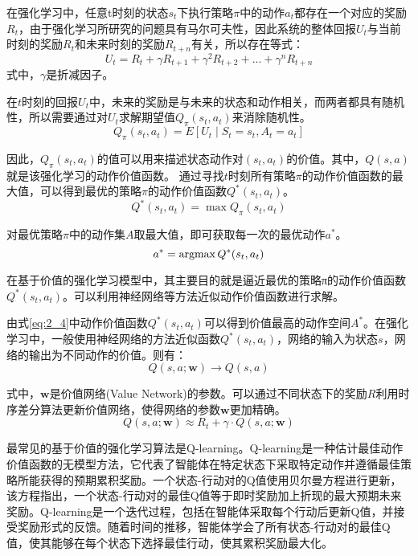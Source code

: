 在强化学习中，任意t时刻的状态$s_t$下执行策略$\pi$中的动作$a_t$都存在一个对应的奖励$R_t$，由于强化学习所研究的问题具有马尔可夫性，因此系统的整体回报$U_t$与当前时刻的奖励$R_t$和未来时刻的奖励$R_{t+n}$有关，所以存在等式：
\begin{equation}
  \label{eq:2_1}
  U_t = R_t + \gamma R_{t+1} + \gamma^2 R_{t+2} + ... + \gamma^n R_{t+n}
\end{equation}
式中，$\gamma$是折减因子。

在$t$时刻的回报$U_t$中，未来的奖励是与未来的状态和动作相关，而两者都具有随机性，所以需要通过对$U_t$求解期望值$Q_π (s_t,a_t)$来消除随机性\cite{XTYY202012003}。
\begin{equation}
  \label{eq:2_2}
  Q_π (s_t,a_t) = E[U_t\mid S_t=s_t, A_t = a_t]
\end{equation}

因此，$Q_π (s_t,a_t)$的值可以用来描述状态动作对$(s_t,a_t )$的价值。其中，$Q(s,a)$就是该强化学习的动作价值函数。
通过寻找$t$时刻所有策略$\pi$的动作价值函数的最大值，可以得到最优的策略$\pi$的动作价值函数$Q^* (s_t,a_t )$。
\begin{equation}
  \label{eq:2_3}
  Q^* (s_t,a_t) = \max Q_π (s_t,a_t)
\end{equation}

对最优策略$\pi$中的动作集$A$取最大值，即可获取每一次的最优动作$a^*$。
\begin{equation}
  \label{eq:2_4}
  a^* = \operatorname*{argmax} Q^* (s_t,a_t)
\end{equation}

在基于价值的强化学习模型中，其主要目的就是逼近最优的策略π的动作价值函数$Q^* (s_t,a_t )$。可以利用神经网络等方法近似动作价值函数进行求解。

由式\ref{eq:2_4}中动作价值函数$Q^* (s_t,a_t )$可以得到价值最高的动作空间$A^*$。在强化学习中，一般使用神经网络的方法近似函数$Q^* (s_t,a_t )$，网络的输入为状态$s$，网络的输出为不同动作的价值。则有：
\begin{equation}
  \label{eq:2_5}
  Q(s,a;\mathbf{w}) \rightarrow Q(s,a)
\end{equation}

	式中，$\mathbf{w}$是价值网络(Value Network)的参数。可以通过不同状态下的奖励$R$利用时序差分算法更新价值网络，使得网络的参数$\mathbf{w}$更加精确。
\begin{equation}
  \label{eq:2_6}
  Q(s,a;\mathbf{w}) \approx R_t + \gamma \cdot Q(s,a;\mathbf{w})
\end{equation}

最常见的基于价值的强化学习算法是Q-learning。Q-learning是一种估计最佳动作价值函数的无模型方法，它代表了智能体在特定状态下采取特定动作并遵循最佳策略所能获得的预期累积奖励。一个状态-行动对的Q值使用贝尔曼方程进行更新，该方程指出，一个状态-行动对的最佳Q值等于即时奖励加上折现的最大预期未来奖励。Q-learning是一个迭代过程，包括在智能体采取每个行动后更新Q值，并接受奖励形式的反馈。随着时间的推移，智能体学会了所有状态-行动对的最佳Q值，使其能够在每个状态下选择最佳行动，使其累积奖励最大化。

